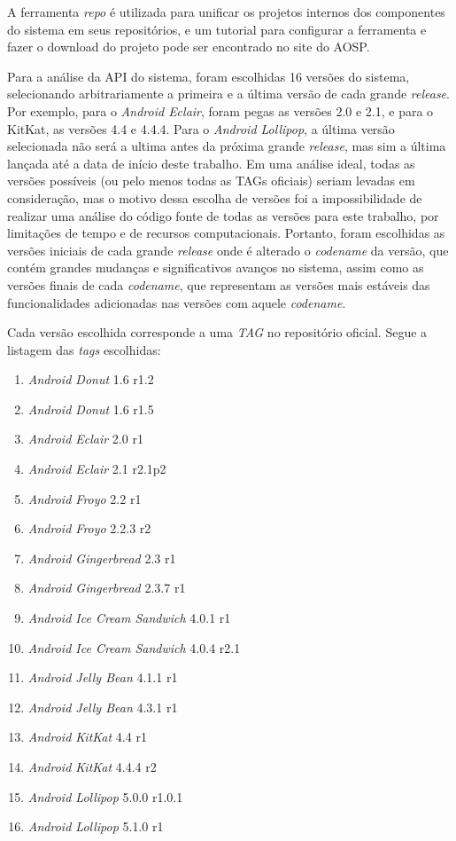 A ferramenta \textit{repo} é utilizada para unificar os projetos internos dos componentes do sistema em seus repositórios, e um tutorial para configurar a ferramenta e fazer o download do projeto pode ser encontrado no site do AOSP.

Para a análise da API do sistema, foram escolhidas 16 versões do sistema, selecionando arbitrariamente a primeira e a última versão de cada grande \textit{release}. Por exemplo, para o \textit{Android Eclair}, foram pegas as versões 2.0 e 2.1, e para o KitKat, as versões 4.4 e 4.4.4. Para o \textit{Android Lollipop}, a última versão selecionada não será a ultima antes da próxima grande \textit{release}, mas sim a última lançada até a data de início deste trabalho. Em uma análise ideal, todas as versões possíveis (ou pelo menos todas as TAGs oficiais) seriam levadas em consideração, mas o motivo dessa escolha de versões foi a impossibilidade de realizar uma análise do código fonte de todas as versões para este trabalho, por limitações de tempo e de recursos computacionais. Portanto, foram escolhidas as versões iniciais de cada grande \textit{release} onde é alterado o \textit{codename} da versão, que contém grandes mudanças e significativos avanços no sistema, assim como as versões finais de cada \textit{codename}, que representam as versões mais estáveis das funcionalidades adicionadas nas versões com aquele \textit{codename}.
 
Cada versão escolhida corresponde a uma \textit{TAG} no repositório oficial. Segue a listagem das \textit{tags} escolhidas:
\begin{enumerate}
\item \textit{Android Donut} 1.6 r1.2
\item \textit{Android Donut} 1.6 r1.5
\item \textit{Android Eclair} 2.0 r1
\item \textit{Android Eclair} 2.1 r2.1p2
\item \textit{Android Froyo} 2.2 r1
\item \textit{Android Froyo} 2.2.3 r2
\item \textit{Android Gingerbread} 2.3 r1
\item \textit{Android Gingerbread} 2.3.7 r1
\item \textit{Android Ice Cream Sandwich} 4.0.1 r1
\item \textit{Android Ice Cream Sandwich} 4.0.4 r2.1
\item \textit{Android Jelly Bean} 4.1.1 r1
\item \textit{Android Jelly Bean} 4.3.1 r1
\item \textit{Android KitKat} 4.4 r1
\item \textit{Android KitKat} 4.4.4 r2
\item \textit{Android Lollipop} 5.0.0 r1.0.1
\item \textit{Android Lollipop} 5.1.0 r1
\end{enumerate}


